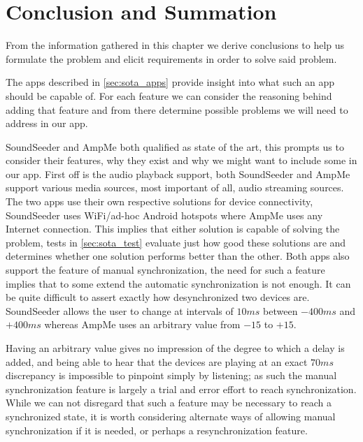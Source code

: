 \section{Conclusion and Summation}
From the information gathered in this chapter we derive conclusions to help us formulate the problem and elicit requirements in order to solve said problem.

\bigskip
The apps described in \cref{sec:sota_apps} provide insight into what such an app should be capable of.
For each feature we can consider the reasoning behind adding that feature and from there determine possible problems we will need to address in our app.

SoundSeeder and AmpMe both qualified as state of the art, this prompts us to consider their features, why they exist and why we might want to include some in our app.
First off is the audio playback support, both SoundSeeder and AmpMe support various media sources, most important of all, audio streaming sources.
The two apps use their own respective solutions for device connectivity, SoundSeeder uses WiFi/ad-hoc Android hotspots where AmpMe uses any Internet connection.
This implies that either solution is capable of solving the problem, tests in \cref{sec:sota_test} evaluate just how good these solutions are and determines whether one solution performs better than the other.
Both apps also support the feature of manual synchronization, the need for such a feature implies that to some extend the automatic synchronization is not enough.
It can be quite difficult to assert exactly how desynchronized two devices are.
SoundSeeder allows the user to change at intervals of $10 ms$ between $-400 ms$ and $+400 ms$ whereas AmpMe uses an arbitrary value from $-15$ to $+15$.

Having an arbitrary value gives no impression of the degree to which a delay is added, and being able to hear that the devices are playing at an exact $70ms$ discrepancy is impossible to pinpoint simply by listening; as such the manual synchronization feature is largely a trial and error effort to reach synchronization.
While we can not disregard that such a feature may be necessary to reach a synchronized state, it is worth considering alternate ways of allowing manual synchronization if it is needed, or perhaps a resynchronization feature.

